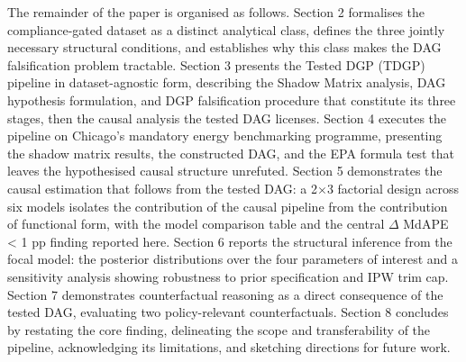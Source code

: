 The remainder of the paper is organised as follows. Section 2 formalises the compliance-gated dataset as a distinct analytical class, defines the three jointly necessary structural conditions, and establishes why this class makes the DAG falsification problem tractable. Section 3 presents the Tested DGP (TDGP) pipeline in dataset-agnostic form, describing the Shadow Matrix analysis, DAG hypothesis formulation, and DGP falsification procedure that constitute its three stages, then the causal analysis the tested DAG licenses. Section 4 executes the pipeline on Chicago's mandatory energy benchmarking programme, presenting the shadow matrix results, the constructed DAG, and the EPA formula test that leaves the hypothesised causal structure unrefuted. Section 5 demonstrates the causal estimation that follows from the tested DAG: a 2$\times$3 factorial design across six models isolates the contribution of the causal pipeline from the contribution of functional form, with the model comparison table and the central $\Delta$ MdAPE < 1 pp finding reported here. Section 6 reports the structural inference from the focal model: the posterior distributions over the four parameters of interest and a sensitivity analysis showing robustness to prior specification and IPW trim cap. Section 7 demonstrates counterfactual reasoning as a direct consequence of the tested DAG, evaluating two policy-relevant counterfactuals. Section 8 concludes by restating the core finding, delineating the scope and transferability of the pipeline, acknowledging its limitations, and sketching directions for future work.

